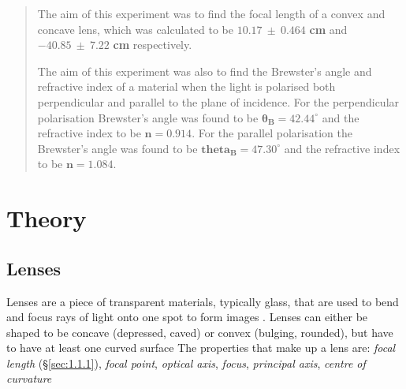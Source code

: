 \documentclass[12pt]{article}
\begin{document}
\setcounter{page}{1}
\tableofcontents

\newpage

\begin{abstract}

\vspace{1cm}

The aim of this experiment was to find the focal length of a convex and concave lens, which was calculated to be $\mathbf{10.17 \: \pm \: 0.464}$ \textbf{cm}
and $\mathbf{-40.85 \: \pm \: 7.22}$ \textbf{cm} respectively.

The aim of this experiment was also to find the Brewster's angle and refractive \break index of a material when the light is polarised both perpendicular and parallel to
the plane of incidence. For the perpendicular polarisation Brewster's angle was found to be $\mathbf{\theta_B = 42.44^{\circ}}$ and the refractive index to be
$\mathbf{n=0.914}$. For the parallel polarisation the Brewster's angle was found to be $\mathbf{theta_B =47.30^{\circ}}$ and the refractive index to be
$\mathbf{n=1.084}$.

\end{abstract}


\section{Theory} \label{sec:1}

\subsection{Lenses} \label{sec:1.1}

Lenses are a piece of transparent materials, typically glass, that are used to bend and focus rays of light onto one spot to form images
\cite{britlens,vedantulens}.
Lenses can either be shaped to be concave (depressed, caved) or convex (bulging, rounded), but have to have at least one curved surface
\cite{britlens,vedantulens}
The properties that make up a lens are: \textit{focal length} (§\ref{sec:1.1.1}), \textit{focal point}, \textit{optical axis}, \textit{focus}, \textit{principal axis}, \textit{centre of curvature}
\cite{geekconcave,geekconvex}
\end{document}

